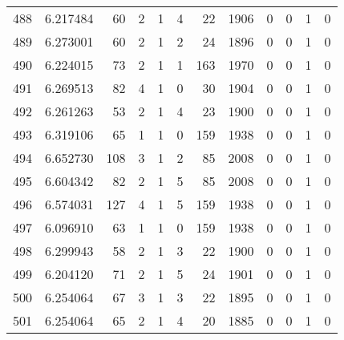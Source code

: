 \begin{tabular}{lrrrrrrrrrrr}
488 &  6.217484 &   60 &      2 &        1 &      4 &              22 &  1906 &               0 &               0 &               1 &               0 \\
489 &  6.273001 &   60 &      2 &        1 &      2 &              24 &  1896 &               0 &               0 &               1 &               0 \\
490 &  6.224015 &   73 &      2 &        1 &      1 &             163 &  1970 &               0 &               0 &               1 &               0 \\
491 &  6.269513 &   82 &      4 &        1 &      0 &              30 &  1904 &               0 &               0 &               1 &               0 \\
492 &  6.261263 &   53 &      2 &        1 &      4 &              23 &  1900 &               0 &               0 &               1 &               0 \\
493 &  6.319106 &   65 &      1 &        1 &      0 &             159 &  1938 &               0 &               0 &               1 &               0 \\
494 &  6.652730 &  108 &      3 &        1 &      2 &              85 &  2008 &               0 &               0 &               1 &               0 \\
495 &  6.604342 &   82 &      2 &        1 &      5 &              85 &  2008 &               0 &               0 &               1 &               0 \\
496 &  6.574031 &  127 &      4 &        1 &      5 &             159 &  1938 &               0 &               0 &               1 &               0 \\
497 &  6.096910 &   63 &      1 &        1 &      0 &             159 &  1938 &               0 &               0 &               1 &               0 \\
498 &  6.299943 &   58 &      2 &        1 &      3 &              22 &  1900 &               0 &               0 &               1 &               0 \\
499 &  6.204120 &   71 &      2 &        1 &      5 &              24 &  1901 &               0 &               0 &               1 &               0 \\
500 &  6.254064 &   67 &      3 &        1 &      3 &              22 &  1895 &               0 &               0 &               1 &               0 \\
501 &  6.254064 &   65 &      2 &        1 &      4 &              20 &  1885 &               0 &               0 &               1 &               0 \\

\end{tabular}
